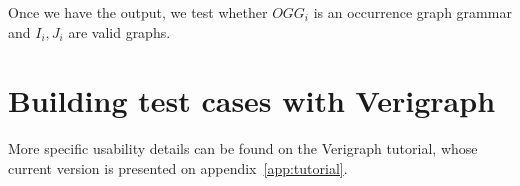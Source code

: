 \begin{example}
\end{example}

Once we have the output, we test whether $OGG_i$ is an occurrence graph grammar and $I_i, J_i$ are valid graphs.

\begin{example}[]
\end{example}

\section{Building test cases with Verigraph}

More specific usability details can be found on the Verigraph tutorial, whose current version is presented on appendix~\ref{app:tutorial}.
